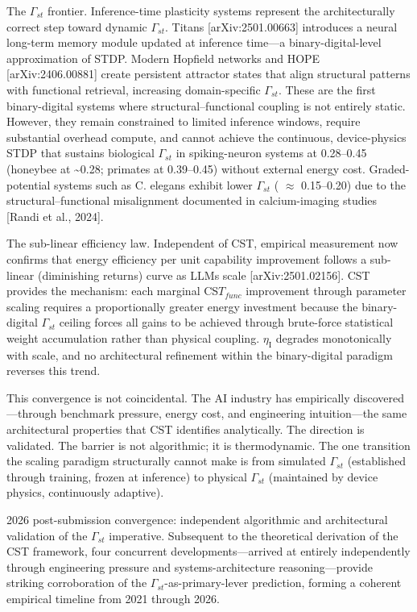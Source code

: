 \documentclass[a4paper,12pt]{article}
\begin{document}
The $\Gamma_{st}$ frontier.
Inference-time plasticity systems represent the architecturally correct step toward dynamic $\Gamma_{st}$.
Titans [arXiv:2501.00663] introduces a neural long-term memory module updated at inference time---a binary-digital-level approximation of STDP.
Modern Hopfield networks and HOPE [arXiv:2406.00881] create persistent attractor states that align structural patterns with functional retrieval, increasing domain-specific $\Gamma_{st}$.
These are the first binary-digital systems where structural--functional coupling is not entirely static.
However, they remain constrained to limited inference windows, require substantial overhead compute, and cannot achieve the continuous, device-physics STDP that sustains biological $\Gamma_{st}$ in spiking-neuron systems at 0.28--0.45 (honeybee at \textasciitilde{}0.28; primates at 0.39--0.45) without external energy cost.
Graded-potential systems such as C. elegans exhibit lower $\Gamma_{st}$ ( $\approx$  0.15--0.20) due to the structural--functional misalignment documented in calcium-imaging studies [Randi et al., 2024].

The sub-linear efficiency law.
Independent of CST, empirical measurement now confirms that energy efficiency per unit capability improvement follows a sub-linear (diminishing returns) curve as LLMs scale [arXiv:2501.02156].
CST provides the mechanism: each marginal CS$T_{func}$ improvement through parameter scaling requires a proportionally greater energy investment because the binary-digital $\Gamma_{st}$ ceiling forces all gains to be achieved through brute-force statistical weight accumulation rather than physical coupling. $\eta_{\text{I}}$ degrades monotonically with scale, and no architectural refinement within the binary-digital paradigm reverses this trend.

This convergence is not coincidental.
The AI industry has empirically discovered---through benchmark pressure, energy cost, and engineering intuition---the same architectural properties that CST identifies analytically.
The direction is validated.
The barrier is not algorithmic; it is thermodynamic.
The one transition the scaling paradigm structurally cannot make is from simulated $\Gamma_{st}$ (established through training, frozen at inference) to physical $\Gamma_{st}$ (maintained by device physics, continuously adaptive).

2026 post-submission convergence: independent algorithmic and architectural validation of the $\Gamma_{st}$ imperative. Subsequent to the theoretical derivation of the CST framework, four concurrent developments---arrived at entirely independently through engineering pressure and systems-architecture reasoning---provide striking corroboration of the $\Gamma_{st}$-as-primary-lever prediction, forming a coherent empirical timeline from 2021 through 2026.
\end{document}
